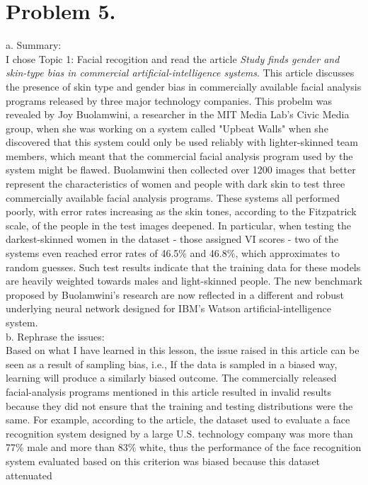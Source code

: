 \documentclass{article}
\begin{document}
    \section*{Problem 5.}
    a. Summary:\\
    I chose Topic 1: Facial recogition and read the article \textit{Study finds gender and skin-type bias in 
    commercial artificial-intelligence systems}. This article discusses the presence of skin type and gender 
    bias in commercially available facial analysis programs released by three major technology companies. 
    This probelm was revealed by Joy Buolamwini, a researcher in the MIT Media Lab's Civic Media 
    group, when she was working on a system called "Upbeat Walls" when she discovered that this system 
    could only be used reliably with lighter-skinned team members, which meant that the commercial facial 
    analysis program used by the system might be flawed. Buolamwini then collected over 1200 images that 
    better represent the characteristics of women and people with dark skin to test three commercially 
    available facial analysis programs. These systems all performed poorly, with error rates increasing as the 
    skin tones, according to the Fitzpatrick scale, of the people in the test images deepened. In particular, 
    when testing the darkest-skinned women in the dataset - those assigned VI scores - two of the systems even 
    reached error rates of 46.5\% and 46.8\%, which approximates to random guesses. Such test results indicate 
    that the training data for these models are heavily weighted towards males and light-skinned people. The 
    new benchmark proposed by Buolamwini's research are now reflected in a different and robust underlying 
    neural network designed for IBM's Watson artificial-intelligence system.\\
    b. Rephrase the issues:\\
    Based on what I have learned in this lesson, the issue raised in this article can be seen as a result 
    of sampling bias, i.e., If the data is sampled in a biased way, learning will produce a similarly biased 
    outcome. The commercially released facial-analysis programs mentioned in this article resulted in 
    invalid results because they did not ensure that the training and testing distributions were the same. For 
    example, according to the article, the dataset used to evaluate a face recognition system designed by a 
    large U.S. technology company was more than 77\% male and more than 83\% white, thus the performance of the 
    face recognition system evaluated based on this criterion was biased because this dataset attenuated 
\end{document}
